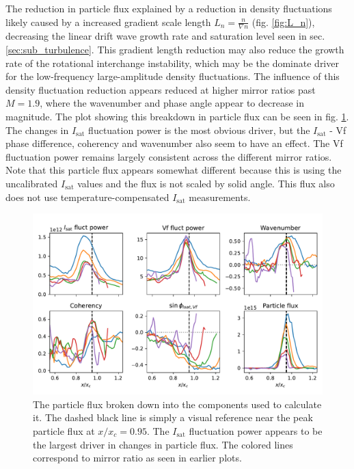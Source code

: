 The reduction in particle flux explained by a reduction in density fluctuations likely caused by a increased gradient scale length $L_n = \frac{n}{\nabla n }$ (fig. \ref{fig:L_n}), decreasing the linear drift wave growth rate and saturation level seen in sec. \ref{sec:sub_turbulence}. This gradient length reduction may also reduce the growth rate of the rotational interchange instability, which may be the dominate driver for the low-frequency large-amplitude density fluctuations. The influence of this density fluctuation reduction appears reduced at higher mirror ratios past $M=1.9$, where the wavenumber and phase angle appear to decrease in magnitude. The plot showing this breakdown in particle flux can be seen in fig. \ref{fig_extra:particle_flux_breakdown}. The changes in $I_\text{sat}$ fluctuation power is the most obvious driver, but the $I_\text{sat}$ - Vf phase difference, coherency and wavenumber also seem to have an effect. The Vf fluctuation power remains largely consistent across the different mirror ratios. Note that this particle flux appears somewhat different because this is using the uncalibrated $I_\text{sat}$ values and the flux is not scaled by solid angle. This flux also does not use temperature-compensated $I_\text{sat}$ measurements.

\begin{figure}
    \centering
    \includegraphics[width=450pt]{figures/extra/particle_flux_breakdown.pdf}
    \caption[Particle flux: breakdown into components]{The particle flux broken down into the components used to calculate it. The dashed black line is simply a visual reference near the peak particle flux at $x/x_c=0.95$. The $I_\text{sat}$ fluctuation power appears to be the largest driver in changes in particle flux. The colored lines correspond to mirror ratio as seen in earlier plots.}
    \label{fig_extra:particle_flux_breakdown}
\end{figure}

